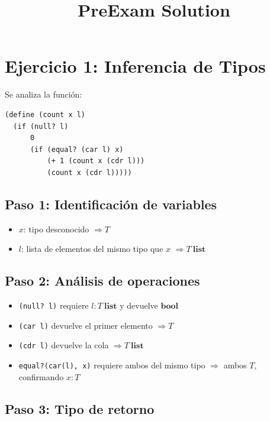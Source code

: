 \documentclass[11pt]{article}
\title{PreExam Solution}
\author{}
\date{}
\begin{document}
\maketitle


\section{Ejercicio 1: Inferencia de Tipos}


Se analiza la función:

\begin{verbatim}
(define (count x l)
  (if (null? l)
      0
      (if (equal? (car l) x)
          (+ 1 (count x (cdr l)))
          (count x (cdr l)))))
\end{verbatim}

\subsection*{Paso 1: Identificación de variables}

\begin{itemize}
    \item $x$: tipo desconocido $\Rightarrow T$
    \item $l$: lista de elementos del mismo tipo que $x$
          $\Rightarrow T\ \mathbf{list}$
\end{itemize}

\subsection*{Paso 2: Análisis de operaciones}

\begin{itemize}
    \item \texttt{(null? l)} requiere $l : T\ \mathbf{list}$ y devuelve
          $\mathbf{bool}$
    \item \texttt{(car l)} devuelve el primer elemento $\Rightarrow T$
    \item \texttt{(cdr l)} devuelve la cola $\Rightarrow T\ \mathbf{list}$
    \item \texttt{equal?(car(l), x)} requiere ambos del mismo tipo
          $\Rightarrow$ ambos $T$, confirmando $x : T$
\end{itemize}

\subsection*{Paso 3: Tipo de retorno}
\end{document}
